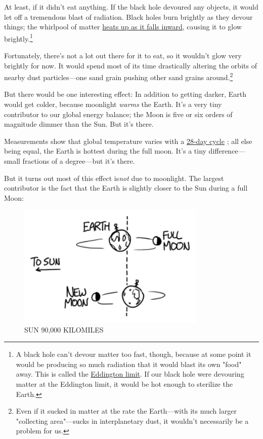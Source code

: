 {{At least, if it didn't eat anything. If the black hole devoured any objects, it would let off a tremendous blast of radiation. Black holes burn brightly as they devour things; the whirlpool of matter \href{http://www.gothosenterprises.com/black\_holes/outside\_black\_holes.html}{heats up as it falls inward}, causing it to glow brightly.{\footnote{A black hole can't devour matter too fast, though, because at some point it would be producing so much radiation that it would blast its own "food" away. This is called the \href{http://en.wikipedia.org/wiki/Eddington\_luminosity} {Eddington limit}.
If our black hole were devouring matter at the Eddington limit, it would be hot enough to sterilize the Earth.} } }

{Fortunately, there's not a lot out there for it to eat, so it wouldn't glow very brightly for now. It would spend most of its time drastically altering the orbits of nearby dust particles—one sand grain pushing other sand grains around.{\footnote{Even if it sucked in matter at the rate the Earth—with its much larger "collecting area"—sucks in interplanetary dust, it wouldn't necessarily be a problem for us.} } }

{But there would be one interesting effect: In addition to getting darker, Earth would get colder, because moonlight \emph{warms} the Earth. It's a very tiny contributor to our global energy balance; the Moon is five or six orders of magnitude dimmer than the Sun. But it's there.}

{Measurements show that global temperature varies with a \href{http://onlinelibrary.wiley.com/doi/10.1029/2000GL011651/abstract}{28-day cycle} ; all else being equal, the Earth is hottest during the full moon. It's a tiny difference—small fractions of a degree—but it's there.}

{But it turns out most of this effect is\emph{not} due to moonlight. The largest contributor is the fact that the Earth is slightly closer to the Sun during a full Moon:}

\begin{figure}[!htbp]
\centering
\includegraphics[scale=0.5, max width=0.8\textwidth]{imgs/a/129/barycenter.png}
\caption{SUN 90,000 KILOMILES}
\end{figure}

}
